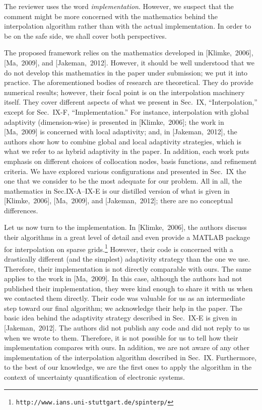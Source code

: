 \begin{authors}
The reviewer uses the word \emph{implementation}. However, we suspect that the
comment might be more concerned with the mathematics behind the interpolation
algorithm rather than with the actual implementation. In order to be on the safe
side, we shall cover both perspectives.

The proposed framework relies on the mathematics developed in [Klimke,~2006],
[Ma,~2009], and [Jakeman,~2012]. However, it should be well understood that we
do not develop this mathematics in the paper under submission; we put it into
practice. The aforementioned bodies of research are theoretical. They do provide
numerical results; however, their focal point is on the interpolation machinery
itself. They cover different aspects of what we present in Sec.~IX,
``Interpolation,'' except for Sec.~IX-F, ``Implementation.'' For instance,
interpolation with global adaptivity (dimension-wise) is presented in
[Klimke,~2006]; the work in [Ma,~2009] is concerned with local adaptivity; and,
in [Jakeman,~2012], the authors show how to combine global and local adaptivity
strategies, which is what we refer to as hybrid adaptivity in the paper. In
addition, each work puts emphasis on different choices of collocation nodes,
basis functions, and refinement criteria. We have explored various
configurations and presented in Sec.~IX the one that we consider to be the most
adequate for our problem. All in all, the mathematics in Sec.IX-A--IX-E is our
distilled version of what is given in [Klimke,~2006], [Ma,~2009], and
[Jakeman,~2012]; there are no conceptual differences.

Let us now turn to the implementation. In [Klimke,~2006], the authors discuss
their algorithms in a great level of detail and even provide a MATLAB package
for interpolation on sparse
grids.\footnote{\texttt{http://www.ians.uni-stuttgart.de/spinterp/}} However,
their code is concerned with a drastically different (and the simplest)
adaptivity strategy than the one we use. Therefore, their implementation is not
directly comparable with ours. The same applies to the work in [Ma,~2009]. In
this case, although the authors had not published their implementation, they
were kind enough to share it with us when we contacted them directly. Their code
was valuable for us as an intermediate step toward our final algorithm; we
acknowledge their help in the paper. The basic idea behind the adaptivity
strategy described in Sec.~IX-E is given in [Jakeman,~2012]. The authors did not
publish any code and did not reply to us when we wrote to them. Therefore, it is
not possible for us to tell how their implementation compares with ours. In
addition, we are not aware of any other implementation of the interpolation
algorithm described in Sec.~IX. Furthermore, to the best of our knowledge, we
are the first ones to apply the algorithm in the context of uncertainty
quantification of electronic systems.


\end{authors}
